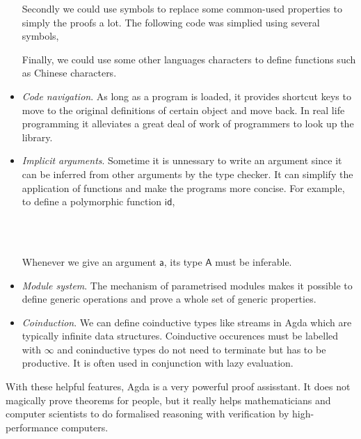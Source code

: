 \begin{itemize}
Secondly we could use symbols to replace some common-used properties to simply the proofs a lot. The following code was simplied using several symbols,


Finally, we could use some other languages characters to define functions such as Chinese characters.

\item \textit{Code navigation}. As long as a program is loaded, it provides shortcut keys to move to the original definitions of certain object and move back. In real life programming it alleviates a great deal of work of programmers to look up the library.

\item \textit{Implicit arguments}. Sometime it is unnessary to write an argument since it can be inferred from other arguments by the type checker. It can simplify the application of functions and make the programs more concise. For example, to define a polymorphic function $\mathsf{id}$,

\begin{code}\>\<%
\\
\> \AgdaSymbol{:} \AgdaSymbol{\{} \AgdaSymbol{:} \AgdaSymbol{\}}    \<%
\\
\>  \AgdaSymbol{=} \<%
\end{code}

Whenever we give an argument $\mathsf{a}$,  its type $\mathsf{A}$ must be inferable.

\item \textit{Module system}. The mechanism of parametrised modules makes it possible to define generic operations and prove a whole set of generic properties.

\item \textit{Coinduction}. We can define coinductive types like streams in Agda which are typically infinite data structures. Coinductive occurences must be labelled with $\infty$ and coninductive types do not need to terminate but has to be productive. It is often used in conjunction with lazy evaluation. \cite{wiki:Coinduction}
	
\end{itemize} 

With these helpful features, Agda is a very powerful proof assisstant. It does not magically prove theorems for people, but it really helps mathematicians and computer scientists to do formalised reasoning with verification by high-performance computers. 


